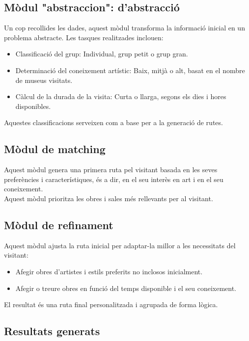 \documentclass[a4paper]{article}
\begin{document}
	
	\subsection{Mòdul "abstraccion": d’abstracció}
	
	Un cop recollides les dades, aquest mòdul transforma la informació inicial en un problema abstracte. Les tasques realitzades inclouen:
	\begin{itemize}
		\item Classificació del grup: Individual, grup petit o grup gran.
		\item Determinació del coneixement artístic: Baix, mitjà o alt, basat en el nombre de museus visitats.
		\item Càlcul de la durada de la visita: Curta o llarga, segons els dies i hores disponibles.
	\end{itemize}
	Aquestes classificacions serveixen com a base per a la generació de rutes.
	
	\subsection{Mòdul de matching}
	
	Aquest mòdul genera una primera ruta pel visitant basada en les seves preferències i característiques, és a dir, en el seu interès en art i en el seu coneixement. \\
	
	Aquest mòdul prioritza les obres i sales més rellevants per al visitant.
	
	\subsection{Mòdul de refinament}
	
	Aquest mòdul ajusta la ruta inicial per adaptar-la millor a les necessitats del visitant:
	\begin{itemize}
		\item Afegir obres d'artistes i estils preferits no inclosos inicialment.
		\item Afegir o treure obres en funció del temps disponible i el seu coneixement.
	\end{itemize}
	El resultat és una ruta final personalitzada i agrupada de forma lògica.
	
	\subsection{Resultats generats}
	
\end{document}
